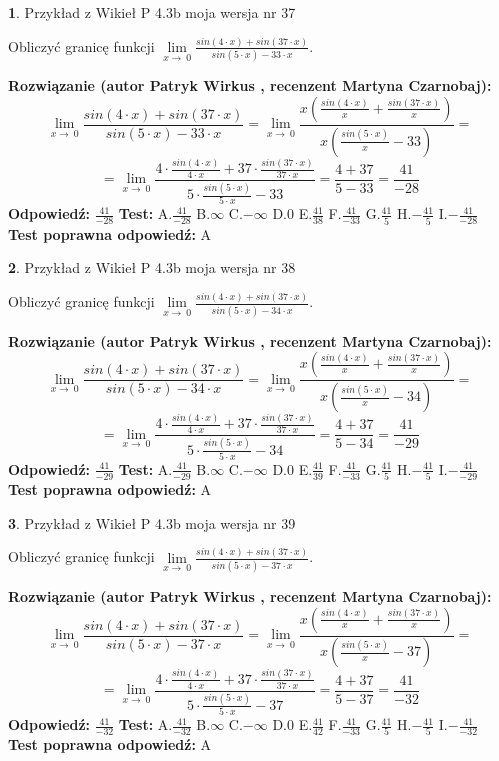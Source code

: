\documentclass[12pt, a4paper]{article}
\theoremstyle{definition} %
\newtheorem{zad}{}
\newcommand{\zadStart}[1]{\begin{zad}#1\newline}
\newcommand{\zadStop}{\end{zad}}
\newcommand{\rozwStart}[2]{\noindent \textbf{Rozwiązanie (autor #1 , recenzent #2): }\newline}
\newcommand{\rozwStop}{\newline}
\newcommand{\odpStart}{\noindent \textbf{Odpowiedź:}\newline}
\newcommand{\odpStop}{\newline}
\newcommand{\testStart}{\noindent \textbf{Test:}\newline}
\newcommand{\testStop}{\newline}
\newcommand{\kluczStart}{\noindent \textbf{Test poprawna odpowiedź:}\newline}
\newcommand{\kluczStop}{\newline}
\begin{document}
\zadStart{Przykład z Wikieł P 4.3b moja wersja nr 37}


Obliczyć granicę funkcji $\lim\limits_{x\to\ 0}\frac{sin(4 \cdot x)+sin(37 \cdot x)}{sin(5 \cdot x)-33 \cdot x}$.
\zadStop
\rozwStart{Patryk Wirkus}{Martyna Czarnobaj}
$$\lim\limits_{x\to\ 0}\frac{sin(4 \cdot x)+sin(37 \cdot x)}{sin(5 \cdot x)-33 \cdot x}=\lim\limits_{x\to\ 0}\frac{x(\frac{sin(4 \cdot x)}{x}+\frac{sin(37 \cdot x)}{x})}{x(\frac{sin(5 \cdot x)}{x}-33)}=$$
$$=\lim\limits_{x\to\ 0}\frac{4 \cdot \frac{sin(4 \cdot x)}{4 \cdot x}+37 \cdot \frac{sin(37 \cdot x)}{37 \cdot x}}{5 \cdot \frac{sin(5 \cdot x)}{5 \cdot x}-33}=\frac{4+37}{5-33} = \frac{41}{-28}$$
\rozwStop
\odpStart
$\frac{41}{-28}$
\odpStop
\testStart
A.$\frac{41}{-28}$
B.$\infty$
C.$-\infty$
D.$0$
E.$\frac{41}{38}$
F.$\frac{41}{-33}$
G.$\frac{41}{5}$
H.$-\frac{41}{5}$
I.$-\frac{41}{-28}$
\testStop
\kluczStart
A
\kluczStop



\zadStart{Przykład z Wikieł P 4.3b moja wersja nr 38}


Obliczyć granicę funkcji $\lim\limits_{x\to\ 0}\frac{sin(4 \cdot x)+sin(37 \cdot x)}{sin(5 \cdot x)-34 \cdot x}$.
\zadStop
\rozwStart{Patryk Wirkus}{Martyna Czarnobaj}
$$\lim\limits_{x\to\ 0}\frac{sin(4 \cdot x)+sin(37 \cdot x)}{sin(5 \cdot x)-34 \cdot x}=\lim\limits_{x\to\ 0}\frac{x(\frac{sin(4 \cdot x)}{x}+\frac{sin(37 \cdot x)}{x})}{x(\frac{sin(5 \cdot x)}{x}-34)}=$$
$$=\lim\limits_{x\to\ 0}\frac{4 \cdot \frac{sin(4 \cdot x)}{4 \cdot x}+37 \cdot \frac{sin(37 \cdot x)}{37 \cdot x}}{5 \cdot \frac{sin(5 \cdot x)}{5 \cdot x}-34}=\frac{4+37}{5-34} = \frac{41}{-29}$$
\rozwStop
\odpStart
$\frac{41}{-29}$
\odpStop
\testStart
A.$\frac{41}{-29}$
B.$\infty$
C.$-\infty$
D.$0$
E.$\frac{41}{39}$
F.$\frac{41}{-33}$
G.$\frac{41}{5}$
H.$-\frac{41}{5}$
I.$-\frac{41}{-29}$
\testStop
\kluczStart
A
\kluczStop



\zadStart{Przykład z Wikieł P 4.3b moja wersja nr 39}


Obliczyć granicę funkcji $\lim\limits_{x\to\ 0}\frac{sin(4 \cdot x)+sin(37 \cdot x)}{sin(5 \cdot x)-37 \cdot x}$.
\zadStop
\rozwStart{Patryk Wirkus}{Martyna Czarnobaj}
$$\lim\limits_{x\to\ 0}\frac{sin(4 \cdot x)+sin(37 \cdot x)}{sin(5 \cdot x)-37 \cdot x}=\lim\limits_{x\to\ 0}\frac{x(\frac{sin(4 \cdot x)}{x}+\frac{sin(37 \cdot x)}{x})}{x(\frac{sin(5 \cdot x)}{x}-37)}=$$
$$=\lim\limits_{x\to\ 0}\frac{4 \cdot \frac{sin(4 \cdot x)}{4 \cdot x}+37 \cdot \frac{sin(37 \cdot x)}{37 \cdot x}}{5 \cdot \frac{sin(5 \cdot x)}{5 \cdot x}-37}=\frac{4+37}{5-37} = \frac{41}{-32}$$
\rozwStop
\odpStart
$\frac{41}{-32}$
\odpStop
\testStart
A.$\frac{41}{-32}$
B.$\infty$
C.$-\infty$
D.$0$
E.$\frac{41}{42}$
F.$\frac{41}{-33}$
G.$\frac{41}{5}$
H.$-\frac{41}{5}$
I.$-\frac{41}{-32}$
\testStop
\kluczStart
A
\kluczStop
\end{document}
